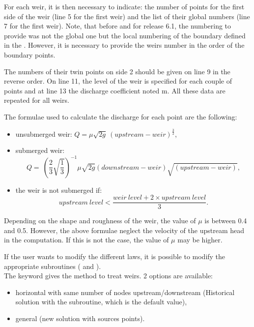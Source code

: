 For each weir, it is then necessary to indicate:
the number of points for the first side of the weir (line 5 for the first weir)
and the list of their global numbers (line 7 for the first weir).
Note, that before and for release 6.1, the numbering to provide was not the
global one but the local numbering of the boundary defined in the
.
However, it is necessary to provide the weirs number in the order of the
boundary points.

The numbers of their twin points on side 2 should be given on line 9 in the
reverse order.
On line 11, the level of the weir is specified for each couple of points
and at line 13 the discharge coefficient noted m.
All these data are repeated for all weirs.

The formulae used to calculate the discharge for each point are the following:

\begin{itemize}
\item unsubmerged weir: $Q=\mu \sqrt{2g}\ {\left(upstream-weir\right)}^{\frac{3}{2}}$,

\item submerged weir:
\[Q=\ {\left(\frac{2}{3}\sqrt{\frac{1}{3}}\right)}^{-1}\mu \sqrt{2g}
\left(downstream-weir\right)\sqrt{\left(upstream-weir\right)},\]

\item the weir is not submerged if:
\[upstream\ level<\frac{weir\ level+2 \times upstream\ level}{3}.\]
\end{itemize}
Depending on the shape and roughness of the weir, the value of $\mu$
is between 0.4 and 0.5.
However, the above formulae neglect the velocity of the upstream head in the
computation.
If this is not the case, the value of $\mu$ may be higher.

If the user wants to modify the different laws, it is possible to modify the
appropriate subroutines ( and ).\\

The keyword  gives the method to treat weirs.
2 options are available:
\begin{itemize}
\item horizontal with same number of nodes upstream/downstream
(Historical solution with the  subroutine,
which is the default value),
\item general (new solution with sources points).
\end{itemize}


